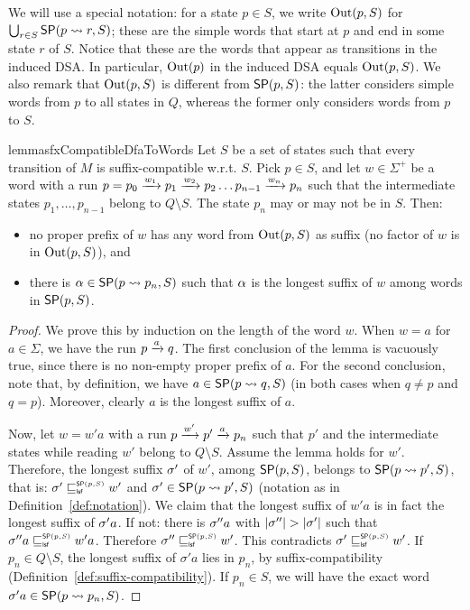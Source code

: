We will use a special
notation: for a state $p \in S$, we write $\operatorname{Out}(p, S)$ for
$\bigcup_{r \in S} \mathsf{SP}(p \rightsquigarrow r, S)$; these are the simple words that
start at $p$ and end in some state $r$ of $S$. Notice that these are
the words that appear as transitions in the induced DSA. In
particular, $\operatorname{Out}(p)$ in the induced DSA equals $\operatorname{Out}(p, S)$. We also remark that $\operatorname{Out}(p,S)$ is different from $\mathsf{SP}(p, S)$: the latter considers simple words from $p$ to all states in $Q$, whereas the former only considers words from $p$ to $S$.


\begin{restatable}{lemma}{sfxCompatibleDfaToWords}
  \label{lem:sfx-compatibility-dfa-paths-to-words}
  Let $S$ be a set of states such that every transition of $M$ is
  suffix-compatible w.r.t. $S$. Pick $p \in S$, and let
  $w \in \Sigma^+$ be a word with a run
  $p = p_0 \xrightarrow{w_1} p_1 \xrightarrow{w_2} p_2 \dots p_{n-1} \xrightarrow{w_n} p_n$
  such that the intermediate states $p_1, \dots, p_{n-1}$ belong to
  $Q \setminus S$. The state $p_n$ may or may not be in $S$. Then:
  \begin{itemize}
  \item no proper prefix of $w$ has any word from $\operatorname{Out}(p,S)$ as
    suffix (no factor of $w$ is in $\operatorname{Out}(p,S)$), and
  \item there is $\alpha \in \mathsf{SP}(p \rightsquigarrow p_n, S)$ such that $\alpha$ is the
    longest suffix of $w$ among words in $\mathsf{SP}(p, S)$.
  \end{itemize}
\end{restatable}

\begin{proof}
  We prove this by induction on the length of the word $w$. When
  $w = a$ for $a \in \Sigma$, we have the run $p \xrightarrow{a} q$. The first
  conclusion of the lemma is vacuously true, since there is no
  non-empty proper prefix of $a$. For the second conclusion, note
  that, by definition, we have $a \in \mathsf{SP}(p \rightsquigarrow q, S)$ (in both cases
  when $q \neq p$ and $q = p$). Moreover, clearly $a$ is the longest
  suffix of $a$.

  Now, let $w = w'a$ with a run $p \xrightarrow{w'} p' \xrightarrow{a} p_n$ such that
  $p'$ and the intermediate states while reading $w'$ belong to
  $Q \setminus S$. Assume the lemma holds for $w'$.  Therefore, the
  longest suffix $\sigma'$ of $w'$, among $\mathsf{SP}(p, S)$, belongs to
  $\mathsf{SP}(p \rightsquigarrow p', S)$, that is: $\sigma' \sqsubseteq_{\scriptscriptstyle \mathsf{lsf}}^{\scriptscriptstyle \mathsf{SP}(p, S)} w'$ and
  $\sigma' \in \mathsf{SP}(p \rightsquigarrow p', S)$ (notation as in
  Definition~\ref{def:notation}). We claim that the longest suffix of
  $w'a$ is in fact the longest suffix of $\sigma' a$.  If not: there
  is $\sigma'' a$ with $|\sigma''| > |\sigma'|$ such that
  $\sigma'' a \sqsubseteq_{\scriptscriptstyle \mathsf{lsf}}^{\scriptscriptstyle \mathsf{SP}(p, S)} w' a$. Therefore
  $\sigma'' \sqsubseteq_{\scriptscriptstyle \mathsf{lsf}}^{\scriptscriptstyle \mathsf{SP}(p, S)} w'$. This contradicts
  $\sigma' \sqsubseteq_{\scriptscriptstyle \mathsf{lsf}}^{\scriptscriptstyle \mathsf{SP}(p, S)} w'$. If $p_n \in Q \setminus S$, the
  longest suffix of $\sigma' a$ lies in $p_n$, by suffix-compatibility
  (Definition~\ref{def:suffix-compatibility}). If $p_n \in S$, we will
  have the exact word $\sigma' a \in \mathsf{SP}(p \rightsquigarrow p_n, S)$. 
  
\end{proof}


